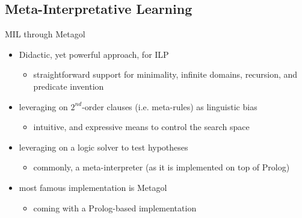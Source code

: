 \documentclass[presentation]{beamer}\mode<presentation>{\usetheme{AMSBolognaFC}}
\begin{document}
\subsection{Meta-Interpretative Learning}

\begin{frame}[allowframebreaks]{MIL through Metagol}
    \begin{itemize}
        \item Didactic, yet powerful approach, for ILP
        \begin{itemize}
            \item straightforward support for minimality, infinite domains, recursion, and predicate invention
        \end{itemize}
        
        \bigskip

        \item leveraging on $2^{nd}$-order clauses (i.e. \alert{meta-rules}) as linguistic bias
        \begin{itemize}
            \item intuitive, and expressive means to control the search space
        \end{itemize}
        
        \bigskip

        \item leveraging on a \alert{logic solver} to test hypotheses
        \begin{itemize}
            \item commonly, a meta-interpreter (as it is implemented on top of Prolog)
        \end{itemize}

        \bigskip

        \item most famous implementation is Metagol
        \begin{itemize}
            \item coming with a Prolog-based implementation 
        \end{itemize}
    \end{itemize}

    \framebreak


\end{frame}
\end{document}
